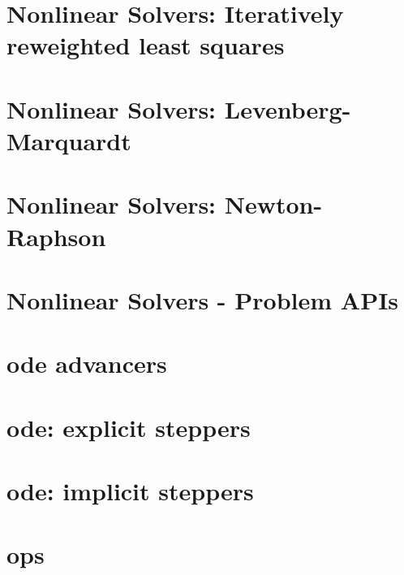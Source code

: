 \let\mypdfximage\pdfximage\def\pdfximage{\immediate\mypdfximage}\documentclass[twoside]{book}
\newcommand{\+}{\discretionary{\mbox{\scriptsize$\hookleftarrow$}}{}{}}
\begin{document}
\chapter{Nonlinear Solvers\+: Iteratively reweighted least squares}
\label{md_pages_components_nonlinsolvers_irls}

\chapter{Nonlinear Solvers\+: Levenberg-\/\+Marquardt}
\label{md_pages_components_nonlinsolvers_lm}

\chapter{Nonlinear Solvers\+: Newton-\/\+Raphson}
\label{md_pages_components_nonlinsolvers_nr}

\chapter{Nonlinear Solvers -\/ Problem APIs}
\label{md_pages_components_nonlinsolvers_system_api}

\chapter{ode advancers}
\label{md_pages_components_ode_advance}

\chapter{ode\+: explicit steppers}
\label{md_pages_components_ode_steppers_explicit}

\chapter{ode\+: implicit steppers}
\label{md_pages_components_ode_steppers_implicit}

\chapter{ops}
\label{md_pages_components_ops}

\end{document}
